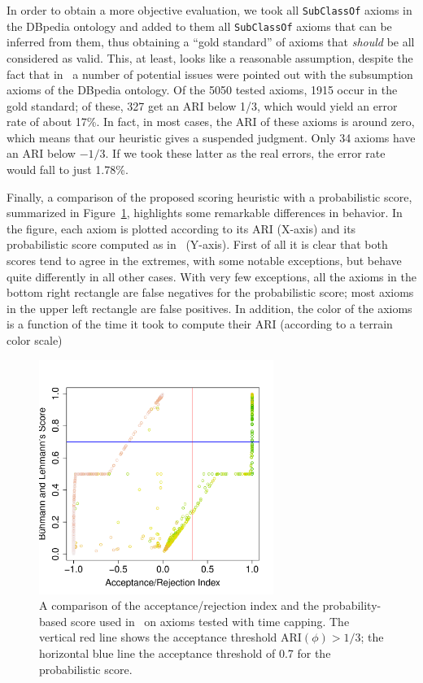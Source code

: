 \documentclass[review]{elsarticle}
\theoremstyle{definition}
\begin{document}
In order to obtain a more objective evaluation, 
we took all \texttt{SubClassOf}
axioms in the DBpedia ontology and added to them all \texttt{SubClassOf} axioms
that can be inferred from them, thus obtaining a ``gold standard'' of axioms
that \emph{should} be all considered as valid. 
This, at least, looks like a reasonable assumption, despite the fact that
in~\cite{TettamanziFaronZuckerGandon2014ekaw}
a number of potential issues were pointed out with the subsumption axioms
of the DBpedia ontology.
Of the 5050 tested axioms, 1915 occur in the gold standard; of these, 327 get an
ARI below 1/3, which would yield an error rate of about 17\%.
In fact, in most cases, the ARI of these axioms is around zero, which means that
our heuristic gives a suspended judgment.
Only 34 axioms have an ARI below $-1/3$. If we took these latter as the real errors,
the error rate would fall to just 1.78\%.

Finally, a comparison of the proposed scoring heuristic with a probabilistic
score, summarized in Figure~\ref{fig:ARI-BLS-dtc}, highlights some remarkable
differences in behavior. In the figure, each axiom is plotted according to its
ARI (X-axis) and its probabilistic score computed as in~\cite{BuehmannLehmann2012}
(Y-axis). First of all it is clear that both scores tend to agree in the extremes,
with some notable exceptions, but behave quite differently in all other cases.
With very few exceptions, all the axioms in the bottom right rectangle are
false negatives for the probabilistic score; most axioms in the upper left rectangle
are false positives. In addition, the color of the axioms is a function
of the time it took to compute their ARI (according to a terrain color scale)

\begin{figure}[t]
\begin{center}
  \includegraphics[height=3in]{ARI-BLS-dtc}
\end{center}
\caption{A comparison of the acceptance/rejection index and the probability-based
  score used in~\cite{BuehmannLehmann2012} on axioms tested with time capping.
  The vertical red line shows the acceptance threshold $\mathrm{ARI}(\phi)>1/3$;
  the horizontal blue line the acceptance threshold of 0.7 for the probabilistic score.}
\label{fig:ARI-BLS-dtc}
\end{figure}
\end{document}
